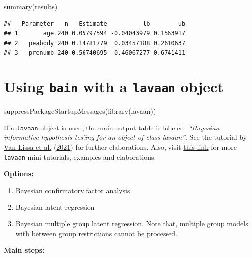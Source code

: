 \documentclass[
]{book}
\newenvironment{Shaded}{\begin{snugshade}}{\end{snugshade}}
\newcommand{\FunctionTok}[1]{\textcolor[rgb]{0.00,0.00,0.00}{#1}}
\newcommand{\NormalTok}[1]{#1}
\begin{document}
\begin{Shaded}
\begin{Highlighting}[]
\FunctionTok{summary}\NormalTok{(results)}
\end{Highlighting}
\end{Shaded}

\begin{verbatim}
##   Parameter   n   Estimate          lb        ub
## 1       age 240 0.05797594 -0.04043979 0.1563917
## 2   peabody 240 0.14781779  0.03457188 0.2610637
## 3   prenumb 240 0.56740695  0.46067277 0.6741411
\end{verbatim}

\hypertarget{lavaan}{%
\section{\texorpdfstring{Using \texttt{bain} with a \texttt{lavaan} object}{Using bain with a lavaan object}}\label{lavaan}}

\begin{Shaded}
\begin{Highlighting}[]
\FunctionTok{suppressPackageStartupMessages}\NormalTok{(}\FunctionTok{library}\NormalTok{(lavaan))}
\end{Highlighting}
\end{Shaded}

If a \texttt{lavaan} object is used, the main output table is labeled:
\emph{``Bayesian informative hypothesis testing for an object
of class lavaan''}. See the tutorial by \protect\hyperlink{ref-van2021teacher}{Van Lissa et al.} (\protect\hyperlink{ref-van2021teacher}{2021}) for further elaborations.
Also, visit \href{www.lavaan.org}{this link} for more \texttt{lavaan} mini tutorials, examples and elaborations.

\textbf{Options:}

\begin{enumerate}
\def\labelenumi{\alph{enumi})}
\item
  Bayesian confirmatory factor analysis
\item
  Bayesian latent regression
\item
  Bayesian multiple group latent regression. Note that, multiple group
  models with between group restrictions cannot be processed.
\end{enumerate}

\textbf{Main steps:}
\end{document}
